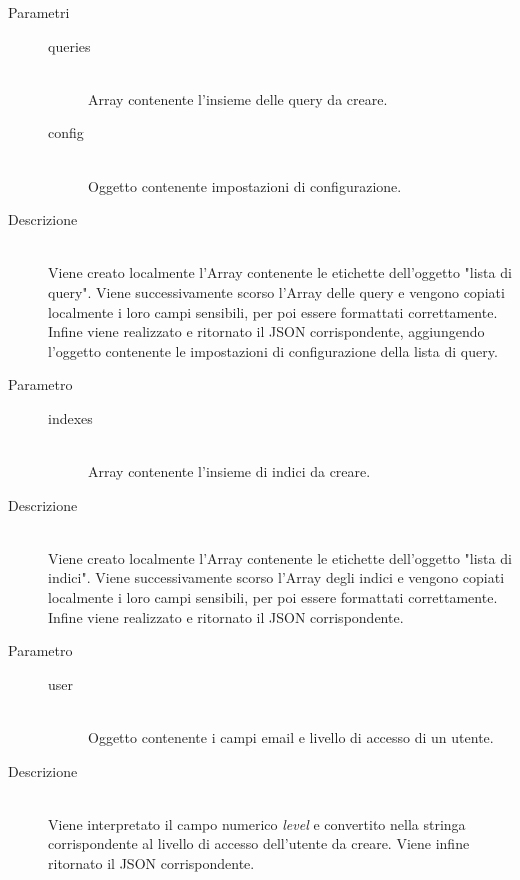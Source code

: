 \begin{description}
\begin{mldescription}
    \hfill
   \begin{description}
    \item[Parametri] \hfill
     \begin{description}
      \item[queries] \hfill \\
      Array contenente l'insieme delle query da creare.
      \item[config] \hfill \\
      Oggetto contenente impostazioni di configurazione.
     \end{description}
    \item[Descrizione] \hfill \\
    Viene creato localmente l'Array contenente le etichette dell'oggetto "lista di query". Viene successivamente scorso l'Array delle query e vengono copiati localmente i loro campi sensibili, per poi essere formattati correttamente. Infine viene realizzato e ritornato il JSON corrispondente, aggiungendo l'oggetto contenente le impostazioni di configurazione della lista di query.
   \end{description}
   
    \hfill
   \begin{description}
    \item[Parametro] \hfill
     \begin{description}
      \item[indexes] \hfill \\
      Array contenente l'insieme di indici da creare.
     \end{description}
    \item[Descrizione] \hfill \\
    Viene creato localmente l'Array contenente le etichette dell'oggetto "lista di indici". Viene successivamente scorso l'Array degli indici e vengono copiati localmente i loro campi sensibili, per poi essere formattati correttamente. Infine viene realizzato e ritornato il JSON corrispondente.
   \end{description}
   
    \hfill
   \begin{description}
    \item[Parametro] \hfill
     \begin{description}
      \item[user] \hfill \\
      Oggetto contenente i campi email e livello di accesso di un utente.
     \end{description}
    \item[Descrizione] \hfill \\
    Viene interpretato il campo numerico \textit{level} e convertito nella stringa corrispondente al livello di accesso dell'utente da creare. Viene infine ritornato il JSON corrispondente.
   \end{description}
   

\end{mldescription}
\end{description}
